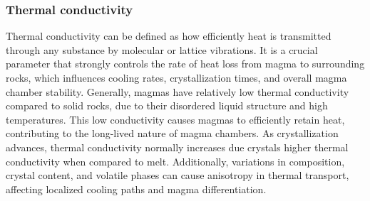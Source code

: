 \subsubsection{Thermal conductivity}
Thermal conductivity can be defined as how efficiently heat is transmitted through any substance by molecular or lattice vibrations. It is a crucial parameter that strongly controls the rate of heat loss from magma to surrounding rocks, which influences cooling rates, crystallization times, and overall magma chamber stability. Generally, magmas have relatively low thermal conductivity compared to solid rocks, due to their disordered liquid structure and high temperatures. This low conductivity causes magmas to efficiently retain heat, contributing to the long-lived nature of magma chambers. As crystallization advances, thermal conductivity normally increases due crystals higher thermal conductivity when compared to melt. Additionally, variations in composition, crystal content, and volatile phases can cause anisotropy in thermal transport, affecting localized cooling paths and magma differentiation.

